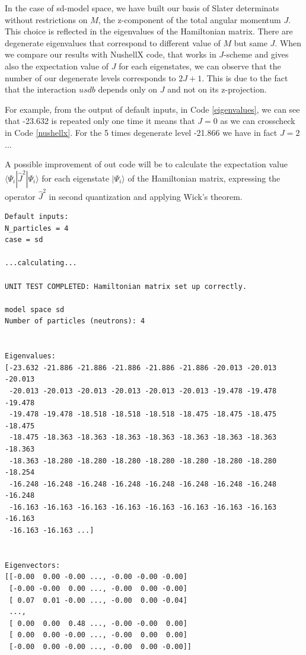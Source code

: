 \documentclass[twoside]{article}
\newcommand{\bra}[1]{\langle #1 |}
\newcommand{\ket}[1]{| #1 \rangle}
\begin{document}
In the case of sd-model space, we have built our basis of Slater determinats without restrictions on $M$, the z-component of the total angular momentum $J$. This choice is reflected in the eigenvalues of the Hamiltonian matrix. There are degenerate eigenvalues that correspond to different value of $M$ but same $J$. When we compare our results with NushellX code, that works in $J$-scheme and gives also the expectation value of $J$ for each eigenstates, we can observe that the number of our degenerate levels corresponds to $2J+1$. This is due to the fact that the interaction $usdb$ depends only on $J$ and not on its z-projection.

For example, from the output of default inputs, in Code \ref{eigenvalues}, we can see that -23.632 is repeated only one time it means that $J=0$ as we can crosscheck in Code \ref{nushellx}. For the 5 times degenerate level -21.866 we have in fact $J=2$ ...

A possible improvement of out code will be to calculate the expectation value $\bra{\Psi_i} \hat J^2 \ket{\Psi_i}$ for each eigenstate $\ket{\Psi_i}$ of the Hamiltonian matrix, expressing the operator $\hat J^2$ in second quantization and applying Wick's theorem.

\begin{lstlisting}[label=eigenvalues,caption= example of the output from \texttt{main.py} when it is run with default inputs. To be noticed the degenerate eigenvalues.]
Default inputs: 
N_particles = 4 
case = sd 

...calculating...

UNIT TEST COMPLETED: Hamiltonian matrix set up correctly.

model space sd
Number of particles (neutrons): 4


Eigenvalues:
[-23.632 -21.886 -21.886 -21.886 -21.886 -21.886 -20.013 -20.013 -20.013
 -20.013 -20.013 -20.013 -20.013 -20.013 -20.013 -19.478 -19.478 -19.478
 -19.478 -19.478 -18.518 -18.518 -18.518 -18.475 -18.475 -18.475 -18.475
 -18.475 -18.363 -18.363 -18.363 -18.363 -18.363 -18.363 -18.363 -18.363
 -18.363 -18.280 -18.280 -18.280 -18.280 -18.280 -18.280 -18.280 -18.254
 -16.248 -16.248 -16.248 -16.248 -16.248 -16.248 -16.248 -16.248 -16.248
 -16.163 -16.163 -16.163 -16.163 -16.163 -16.163 -16.163 -16.163 -16.163
 -16.163 -16.163 ...]


Eigenvectors:
[[-0.00  0.00 -0.00 ..., -0.00 -0.00 -0.00]
 [-0.00 -0.00  0.00 ..., -0.00  0.00 -0.00]
 [ 0.07  0.01 -0.00 ..., -0.00  0.00 -0.04]
 ..., 
 [ 0.00  0.00  0.48 ..., -0.00 -0.00  0.00]
 [ 0.00  0.00 -0.00 ..., -0.00  0.00  0.00]
 [-0.00  0.00 -0.00 ..., -0.00  0.00 -0.00]]
\end{lstlisting}
\end{document}
